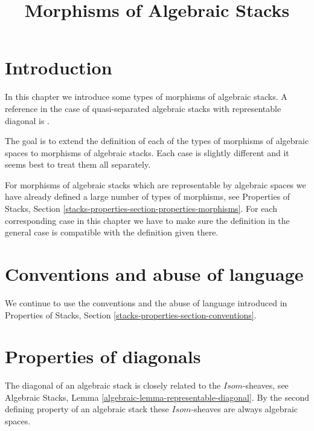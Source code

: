 

%


\title{Morphisms of Algebraic Stacks}


\maketitle

\label{section-phantom}

\tableofcontents

\section{Introduction}
\label{section-introduction}

\noindent
In this chapter we introduce some types of morphisms of algebraic stacks.
A reference in the case of quasi-separated algebraic stacks with representable
diagonal is \cite{LM-B}.

\medskip\noindent
The goal is to extend the definition of each of the types of morphisms of
algebraic spaces to morphisms of algebraic stacks. Each case is slightly
different and it seems best to treat them all separately.

\medskip\noindent
For morphisms of algebraic stacks which are representable
by algebraic spaces we have already defined a large number of types of
morphisms, see
Properties of Stacks,
Section \ref{stacks-properties-section-properties-morphisms}.
For each corresponding case in this chapter
we have to make sure the definition in the general
case is compatible with the definition given there.




\section{Conventions and abuse of language}
\label{section-conventions}

\noindent
We continue to use the conventions and the abuse of language
introduced in
Properties of Stacks, Section \ref{stacks-properties-section-conventions}.




\section{Properties of diagonals}
\label{section-diagonals}

\noindent
The diagonal of an algebraic stack is closely related to the
$\mathit{Isom}$-sheaves, see
Algebraic Stacks, Lemma \ref{algebraic-lemma-representable-diagonal}.
By the second defining property of an algebraic stack these
$\mathit{Isom}$-sheaves are always algebraic spaces.


